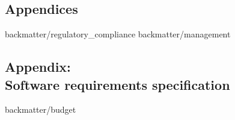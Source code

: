\begin{appendices}
\setcounter{chapter}{9}
\setcounter{section}{0}

\chapter{Appendices}
	 {backmatter/regulatory_compliance}
	\newpage
	 {backmatter/management}
	\newpage
	\section{Appendix: \\Software requirements specification}
		\label{requirements}
		

	\newpage
	 {backmatter/budget}


\end{appendices}
